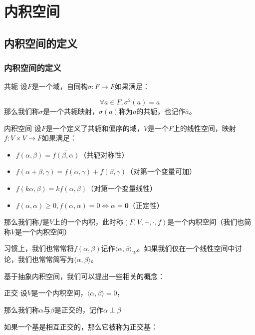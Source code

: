 \documentclass[12pt, a4paper, oneside, UTF8]{ctexbook}
\begin{document}
% 
\else
\fi
\chapter{内积空间}
	\section{内积空间的定义}
		\subsection{内积空间的定义}
			\begin{defn}{共轭}{}
				设$F$是一个域，自同构$\sigma : F \to F$如果满足：

				\begin{equation}
					\forall a \in F,\sigma^2(a)=a
				\end{equation}
				那么我们称$\sigma $是一个共轭映射，$\sigma (a)$称为$a$的共轭，也记作$\overline{a}$。
			\end{defn}
			\begin{defn}{内积空间}{}
				设$F$是一个定义了共轭和偏序的域，$V$是一个$F$上的线性空间，映射$f:V \times V \to F$如果满足：

				\begin{itemize}
					\item $f(\alpha ,\beta )=\overline{f(\beta ,\alpha )}$（共轭对称性）
					\item $f(\alpha +\beta ,\gamma )=f(\alpha ,\gamma )+f(\beta ,\gamma )$（对第一个变量可加）
					\item $f(k\alpha ,\beta )=kf(\alpha ,\beta )$（对第一个变量线性）
					\item $f(\alpha ,\alpha )\geqslant 0,f(\alpha ,\alpha )=0 \Leftrightarrow \alpha =\mathbf{0}$（正定性）
				\end{itemize}
				那么我们称$f$是$V$上的一个内积，此时称$(F,V,+,\cdot,f)$是一个内积空间（我们也简称$V$是一个内积空间）

				习惯上，我们也常常将$f(\alpha ,\beta )$记作$\langle \alpha ,\beta \rangle_W $。如果我们仅在一个线性空间中讨论，我们也常常简写为$\langle \alpha ,\beta \rangle $。
			\end{defn}
			基于抽象内积空间，我们可以提出一些相关的概念：
			\begin{defn}{正交}{}
				设$V$是一个内积空间，$\langle \alpha ,\beta \rangle =0$，
				
				那么我们称$\alpha $与$\beta $是正交的，记作$\alpha \perp \beta $
			\end{defn}
			如果一个基是相互正交的，那么它被称为正交基：
\end{document}

